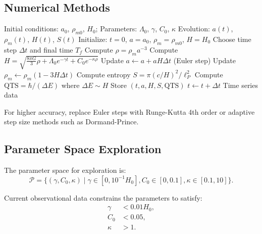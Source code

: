 \subsection{Numerical Methods}

\begin{algorithm}[H]
\caption{Cosmic Evolution with CEA and QTS}
\begin{algorithmic}[1]
\REQUIRE Initial conditions: $a_0$, $\rho_{m0}$, $H_0$; Parameters: $\Lambda_0$, $\gamma$, $C_0$, $\kappa$
\ENSURE Evolution: $a(t)$, $\rho_m(t)$, $H(t)$, $S(t)$
\STATE Initialize: $t = 0$, $a = a_0$, $\rho_m = \rho_{m0}$, $H = H_0$
\STATE Choose time step $\Delta t$ and final time $T_f$
    \STATE Compute $\rho = \rho_m a^{-3}$
    \STATE Compute $H = \sqrt{\frac{8\pi G}{3}\rho + \Lambda_0 e^{-\gamma t} + C_0 e^{-\kappa \rho}}$
    \STATE Update $a \leftarrow a + aH \Delta t$ (Euler step)
    \STATE Update $\rho_m \leftarrow \rho_m(1 - 3H\Delta t)$
    \STATE Compute entropy $S = \pi(c/H)^2/\ell_P^2$
    \STATE Compute $\text{QTS} = \hbar/(\Delta E)$ where $\Delta E \sim H$
    \STATE Store $(t, a, H, S, \text{QTS})$
    \STATE $t \leftarrow t + \Delta t$
\ENDWHILE
\RETURN Time series data
\end{algorithmic}
\end{algorithm}

\begin{remark}
For higher accuracy, replace Euler steps with Runge-Kutta 4th order or adaptive step size methods such as Dormand-Prince.
\end{remark}

\subsection{Parameter Space Exploration}

\begin{definition}
The parameter space for exploration is:
\[
\mathcal{P} = \{(\gamma, C_0, \kappa) \mid \gamma \in [0, 10^{-1}H_0], C_0 \in [0, 0.1], \kappa \in [0.1, 10]\}.
\]
\end{definition}

\begin{theorem}
Current observational data constrains the parameters to satisfy:
\begin{align}
\gamma &< 0.01 H_0, \\
C_0 &< 0.05, \\
\kappa &> 1.
\end{align}
\end{theorem}

